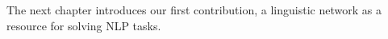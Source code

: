 The next chapter introduces our first contribution, a linguistic network as a resource for solving NLP tasks.


%
	

%
%





